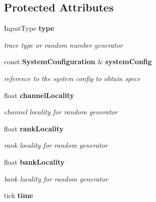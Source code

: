 \subsection*{Protected Attributes}
\begin{DoxyCompactItemize}
\item 
InputType {\bf type}\label{class_d_r_a_msim_i_i_1_1_input_stream_ac5a32f755985849b47a327fbb2fc1421}

\begin{DoxyCompactList}\small\item\em trace type or random number generator \item\end{DoxyCompactList}\item 
const {\bf SystemConfiguration} \& {\bf systemConfig}\label{class_d_r_a_msim_i_i_1_1_input_stream_a1bec6d2f4dca9a84cd862f32f2ea77ef}

\begin{DoxyCompactList}\small\item\em reference to the system config to obtain specs \item\end{DoxyCompactList}\item 
float {\bf channelLocality}\label{class_d_r_a_msim_i_i_1_1_input_stream_a9fdc332fc5d5e387f533f680315c2373}

\begin{DoxyCompactList}\small\item\em channel locality for random generator \item\end{DoxyCompactList}\item 
float {\bf rankLocality}\label{class_d_r_a_msim_i_i_1_1_input_stream_ae35ef6c1f6dc8114cd1f8e306ea777c8}

\begin{DoxyCompactList}\small\item\em rank locality for random generator \item\end{DoxyCompactList}\item 
float {\bf bankLocality}\label{class_d_r_a_msim_i_i_1_1_input_stream_a32e8784fa538cf246cdd3bda6c4d595c}

\begin{DoxyCompactList}\small\item\em bank locality for random generator \item\end{DoxyCompactList}\item 
tick {\bf time}\label{class_d_r_a_msim_i_i_1_1_input_stream_a11d607bf05a648e76d23935dab66fcb1}


\end{DoxyCompactItemize}
